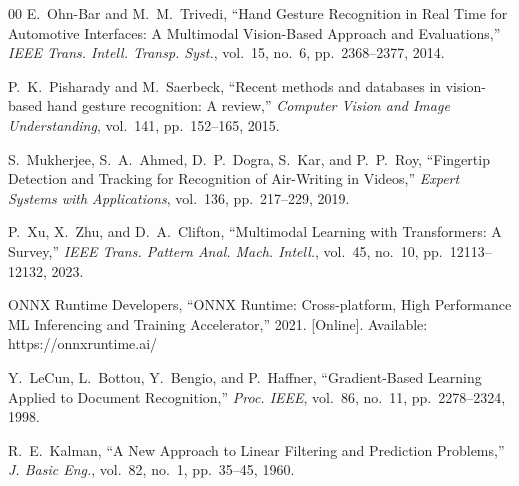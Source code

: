 \documentclass[conference]{IEEEtran}
\begin{document}
\begin{thebibliography}{00}
 E.~Ohn-Bar and M.~M.~Trivedi, ``Hand Gesture Recognition in Real Time for Automotive Interfaces: A Multimodal Vision-Based Approach and Evaluations,'' \textit{IEEE Trans. Intell. Transp. Syst.}, vol.~15, no.~6, pp.~2368--2377, 2014.

 P.~K.~Pisharady and M.~Saerbeck, ``Recent methods and databases in vision-based hand gesture recognition: A review,'' \textit{Computer Vision and Image Understanding}, vol.~141, pp.~152--165, 2015.

 S.~Mukherjee, S.~A.~Ahmed, D.~P.~Dogra, S.~Kar, and P.~P.~Roy, ``Fingertip Detection and Tracking for Recognition of Air-Writing in Videos,'' \textit{Expert Systems with Applications}, vol.~136, pp.~217--229, 2019.

 P.~Xu, X.~Zhu, and D.~A.~Clifton, ``Multimodal Learning with Transformers: A Survey,'' \textit{IEEE Trans. Pattern Anal. Mach. Intell.}, vol.~45, no.~10, pp.~12113--12132, 2023.

 ONNX Runtime Developers, ``ONNX Runtime: Cross-platform, High Performance ML Inferencing and Training Accelerator,'' 2021. [Online]. Available: https://onnxruntime.ai/

 Y.~LeCun, L.~Bottou, Y.~Bengio, and P.~Haffner, ``Gradient-Based Learning Applied to Document Recognition,'' \textit{Proc. IEEE}, vol.~86, no.~11, pp.~2278--2324, 1998.

 R.~E.~Kalman, ``A New Approach to Linear Filtering and Prediction Problems,'' \textit{J. Basic Eng.}, vol.~82, no.~1, pp.~35--45, 1960.

\end{thebibliography}
\end{document}
